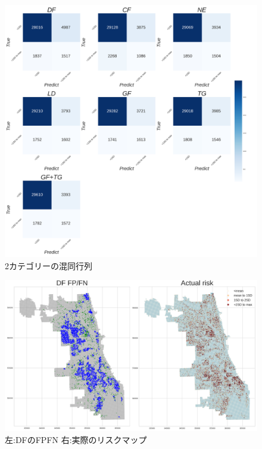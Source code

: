 \begin{figure}
  \centering %
  \includegraphics[scale=0.16]{./add-crime-timeseries-fig/crime_timeseries_two_cm.png}
  \caption{2カテゴリーの混同行列}
  \label{fig:add-crime-timeseries-2cm}
\end{figure}
\begin{figure}
  \centering %
  \includegraphics[scale=0.25]{./add-crime-timeseries-fig/DF_fnp.png}
  \caption{左:DFのFPFN 右:実際のリスクマップ}
  \label{fig:add-crime-timeseries-df-fnp}
\end{figure}

